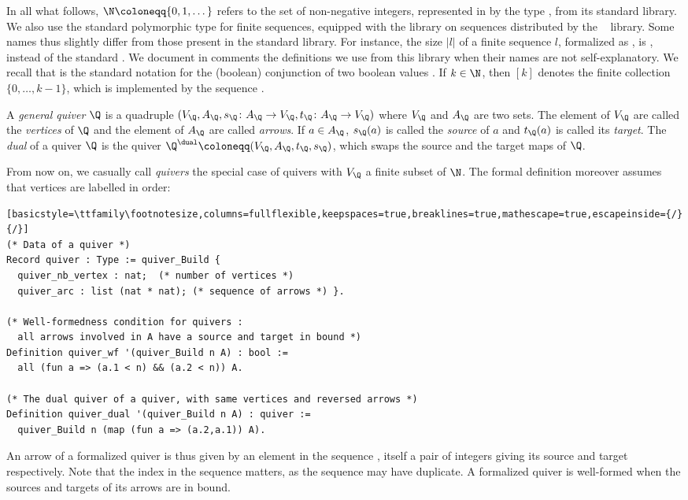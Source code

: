 In all what follows, $\N \coloneqq \{0, 1, \dots \}$ refers to the set of non-negative integers, represented in \Coq{} by the type , from its standard library. We also use the standard polymorphic type  for finite sequences, equipped with the library on sequences distributed by the \MC{}~\cite{assia_mahboubi_2021_4457887} library. Some names thus slightly differ from those present in the standard library. For instance, the size $|l|$ of a finite sequence $l$, formalized as , is , instead of the standard . We document in comments the definitions we use from this library when their names are not self-explanatory. We recall that  is the standard notation for the (boolean) conjunction of two boolean values . If $k\in\N$, then $[k]$ denotes the finite collection $\{0,\dots,k-1\}$, which is implemented by the sequence .

\begin{definition}\label{def:quiv}
  A \emph{general quiver} $\Q$ is a quadruple $(V_\Q, A_\Q, s_\Q\colon A_\Q \to V_\Q, t_\Q\colon A_\Q \to V_\Q)$ where $V_\Q$ and $A_\Q$ are two sets. The element of\/ $V_\Q$ are called the \emph{vertices} of $\Q$ and the element of $A_\Q$ are called \emph{arrows}. If $a \in A_\Q$, $s_\Q(a)$ is called the \emph{source} of $a$ and $t_\Q(a)$ is called its \emph{target}. The \emph{dual} of a quiver $\Q$ is the quiver $\Q^\dual \coloneqq (V_\Q,A_\Q,t_\Q,s_\Q)$, which swaps the source and the target maps of $\Q$.
\end{definition}

From now on, we casually call \emph{quivers} the special case of quivers with $V_\Q$ a finite subset of $\N$. The formal definition moreover assumes that vertices are labelled in order:
\begin{lstlisting}[basicstyle=\ttfamily\footnotesize,columns=fullflexible,keepspaces=true,breaklines=true,mathescape=true,escapeinside={/}{/}]
(* Data of a quiver *)
Record quiver : Type := quiver_Build {
  quiver_nb_vertex : nat;  (* number of vertices *)
  quiver_arc : list (nat * nat); (* sequence of arrows *) }.

(* Well-formedness condition for quivers :
  all arrows involved in A have a source and target in bound *)
Definition quiver_wf '(quiver_Build n A) : bool :=
  all (fun a => (a.1 < n) && (a.2 < n)) A.

(* The dual quiver of a quiver, with same vertices and reversed arrows *)
Definition quiver_dual '(quiver_Build n A) : quiver :=
  quiver_Build n (map (fun a => (a.2,a.1)) A).
\end{lstlisting}
An arrow of a formalized quiver  is thus given by an element in the sequence , itself a pair of integers giving its source and target respectively. Note that the index in the sequence matters, as the sequence may have duplicate. A formalized quiver is well-formed when the sources and targets of its arrows are in bound.

